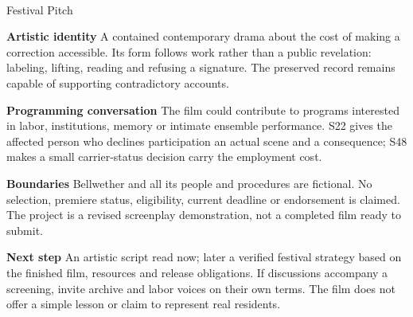 \documentclass[11pt,letterpaper]{article}
\begin{document}
\begin{center}
{\Large\bfseries\sffamily \filmtitleupper}\\[6pt]
Festival Pitch
\end{center}
\textbf{Artistic identity} A contained contemporary drama about the cost of making a correction accessible. Its form follows work rather than a public revelation: labeling, lifting, reading and refusing a signature. The preserved record remains capable of supporting contradictory accounts.

\textbf{Programming conversation} The film could contribute to programs interested in labor, institutions, memory or intimate ensemble performance. S22 gives the affected person who declines participation an actual scene and a consequence; S48 makes a small carrier-status decision carry the employment cost.

\textbf{Boundaries} Bellwether and all its people and procedures are fictional. No selection, premiere status, eligibility, current deadline or endorsement is claimed. The project is a revised screenplay demonstration, not a completed film ready to submit.

\textbf{Next step} An artistic script read now; later a verified festival strategy based on the finished film, resources and release obligations. If discussions accompany a screening, invite archive and labor voices on their own terms. The film does not offer a simple lesson or claim to represent real residents.
\end{document}
